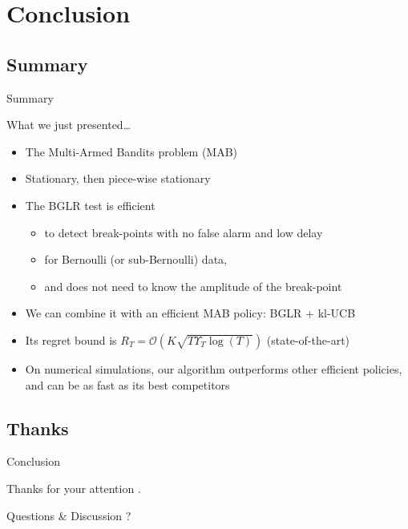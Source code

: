 \documentclass[11pt,english,ignorenonframetext,]{beamer}
\newcommand{\Fontify}{}
\providecommand{\tightlist}{%
  \setlength{\itemsep}{0pt}\setlength{\parskip}{0pt}}
\begin{document}
\section{\hfill{}Conclusion\hfill{}}
\subsection{Summary}

\begin{frame}{Summary}

  What we just presented\ldots{}
  \begin{itemize}
    \item
    The Multi-Armed Bandits problem (MAB)
    \item
    Stationary, then \alert{piece-wise stationary}
    \item
    The BGLR test is efficient
    \begin{itemize}\tightlist
      \item
      to detect break-points with \alert{no false alarm} and \alert{low delay}
      \item
      for Bernoulli (or sub-Bernoulli) data,
      \item
      and does not need to know the amplitude of the break-point
    \end{itemize}
    \item
    We can combine it with an efficient MAB policy:
    \alert{BGLR + kl-UCB}
    \item
    Its regret bound is $R_T = \mathcal{O}(K \sqrt{T \Upsilon_T \log(T)})$ (state-of-the-art)
    \item
    On numerical simulations, our algorithm outperforms other efficient policies, and can be as fast as its best competitors
  \end{itemize}

\end{frame}

\subsection{Thanks}
\begin{frame}{Conclusion}

\begin{center}
  \begin{Large}
    {\Fontify Thanks for your attention .}
    \Smiley[0.9]
  \end{Large}
\end{center}

\vspace*{20pt}

\begin{center}
  \begin{Large}
    Questions \& Discussion ?
  \end{Large}
\end{center}

\end{frame}
\end{document}
